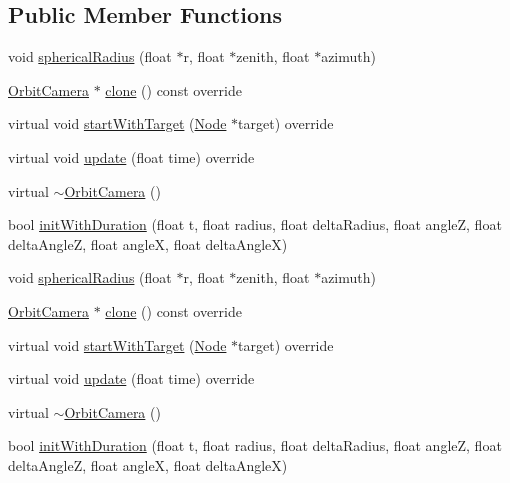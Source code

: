 \subsection*{Public Member Functions}
\begin{DoxyCompactItemize}
\item 
void \hyperlink{classOrbitCamera_aeed357b8f4a5a1a1a3f26142a3b7b80d}{spherical\+Radius} (float $\ast$r, float $\ast$zenith, float $\ast$azimuth)
\item 
\hyperlink{classOrbitCamera}{Orbit\+Camera} $\ast$ \hyperlink{classOrbitCamera_aed66da45d80c719cf06f603875b89ed4}{clone} () const override
\item 
virtual void \hyperlink{classOrbitCamera_ac9e4f661d400a95bf06da3ebb2ad4483}{start\+With\+Target} (\hyperlink{classNode}{Node} $\ast$target) override
\item 
virtual void \hyperlink{classOrbitCamera_af3b5763c1f141127cdb131f1f232d67d}{update} (float time) override
\item 
virtual \hyperlink{classOrbitCamera_ad583133fce414fe8d52385dd262d272d}{$\sim$\+Orbit\+Camera} ()
\item 
bool \hyperlink{classOrbitCamera_a71556e8b55a1084aa656fbcd66897dc5}{init\+With\+Duration} (float t, float radius, float delta\+Radius, float angleZ, float delta\+AngleZ, float angleX, float delta\+AngleX)
\item 
void \hyperlink{classOrbitCamera_aeed357b8f4a5a1a1a3f26142a3b7b80d}{spherical\+Radius} (float $\ast$r, float $\ast$zenith, float $\ast$azimuth)
\item 
\hyperlink{classOrbitCamera}{Orbit\+Camera} $\ast$ \hyperlink{classOrbitCamera_ad3d72a156be5170c01b62a53bf4d6756}{clone} () const override
\item 
virtual void \hyperlink{classOrbitCamera_acb7061358c67002d8e7459ec0911f79d}{start\+With\+Target} (\hyperlink{classNode}{Node} $\ast$target) override
\item 
virtual void \hyperlink{classOrbitCamera_a98a17a86d8b352e6a828b1ee8b096742}{update} (float time) override
\item 
virtual \hyperlink{classOrbitCamera_aa74b8b30c291121fa16fd67973a2bebd}{$\sim$\+Orbit\+Camera} ()
\item 
bool \hyperlink{classOrbitCamera_a71556e8b55a1084aa656fbcd66897dc5}{init\+With\+Duration} (float t, float radius, float delta\+Radius, float angleZ, float delta\+AngleZ, float angleX, float delta\+AngleX)
\end{DoxyCompactItemize}
